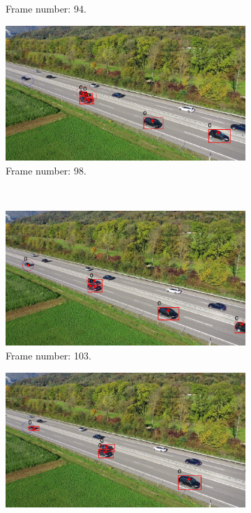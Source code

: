 \begin{figure}[H]
\begin{subfigure}{0.48\textwidth}
        \caption{Frame number: 94.}
        \label{fig:E1-V2-S1:03}
    \end{subfigure}
    \begin{subfigure}{0.48\textwidth}
        \centering
        \includegraphics[width=\linewidth]{../../../experiments/E1/V2/YOLO/98}
        \caption{Frame number: 98.}
        \label{fig:E1-V2-S1:04}
    \end{subfigure}
    \\
    \begin{subfigure}{0.48\textwidth}
        \centering
        \includegraphics[width=\linewidth]{../../../experiments/E1/V2/YOLO/103}
        \caption{Frame number: 103.}
        \label{fig:E1-V2-S1:05}
    \end{subfigure}
    \begin{subfigure}{0.48\textwidth}
        \centering
        \includegraphics[width=\linewidth]{../../../experiments/E1/V2/YOLO/109}

\end{subfigure}
\end{figure}
